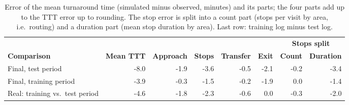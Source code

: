 \begin{table}[htbp]
\centering
\footnotesize
\begin{tabular}{lrrrrrrr}
\toprule
& & & & & & \multicolumn{2}{c}{\textbf{Stops split}} \\ \cmidrule(lr){7-8}
\textbf{Comparison} & \textbf{Mean TTT} & \textbf{Approach} & \textbf{Stops} & \textbf{Transfer} & \textbf{Exit} & \textbf{Count} & \textbf{Duration} \\
\midrule
Final, test period & -8.0 & -1.9 & -3.6 & -0.5 & -2.1 & -0.2 & -3.4 \\
Final, training period & -3.9 & -0.3 & -1.5 & -0.2 & -1.9 & 0.0 & -1.4 \\
Real: training vs.\ test period & -4.6 & -1.8 & -2.3 & -0.6 & 0.0 & -0.3 & -2.0 \\
\bottomrule
\end{tabular}
\caption{Error of the mean turnaround time (simulated minus observed, minutes) and its parts; the four parts add up to the TTT error up to rounding. The stop error is split into a count part (stops per visit by area, i.e.\ routing) and a duration part (mean stop duration by area). Last row: training log minus test log.}
\label{tab:rq2_attribution}
\end{table}
